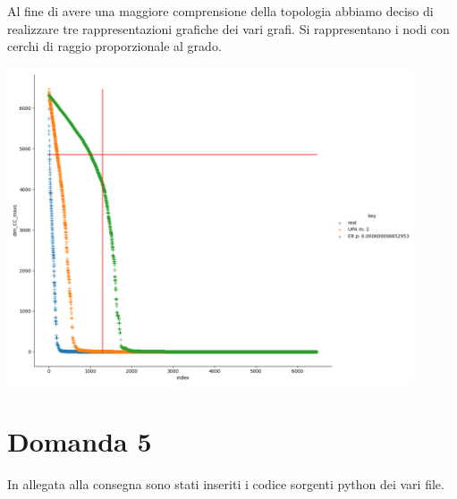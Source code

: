 \documentclass{article}
\begin{document}
Al fine di avere una maggiore comprensione della topologia abbiamo deciso di realizzare tre rappresentazioni grafiche dei vari grafi. Si rappresentano i nodi con cerchi di raggio proporzionale al grado.

\includegraphics[width=0.9\textwidth]{Figure_1}

\section*{Domanda 5}
In allegata alla consegna sono stati inseriti i codice sorgenti python dei vari file.
    
\end{document}
